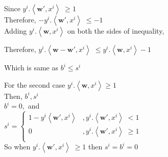 \documentclass[a4paper,11pt]{article}
\begin{document}
\begin{mlsolution}
Since \begin{math} y^{i}.\left \langle \textbf{w}{}', x^{i} \right \rangle \; \geq  1 \end{math} \\
Therefore, \begin{math} - y^{i}.\left \langle \textbf{w}{}', x^{i} \right \rangle \; \leq  -1 \end{math}\\

Adding \begin{math} y^{i}.\left \langle \textbf{w}, x^{i} \right \rangle \end{math} on both the sides of inequality,

Therefore, \begin{math} y^{i}.\left \langle \textbf{w} - \textbf{w}{}', x^{i} \right \rangle \; \leq  y^{i}.\left \langle \textbf{w}, x^{i} \right \rangle - 1 \end{math}

Which is same as \begin{math} b^{i} \leq s^{i} \end{math}

For the second case \begin{math}
y^{i}.\left \langle \textbf{w}, x^{i} \right \rangle \geq 1
\end{math}\\

Then, \begin{math}b^{i}, s^{i}\end{math}\\

\begin{math}
b^{i} = 0 ,
\end{math} and\\

\begin{math}
s^{i} = \left\{\begin{matrix}
1 - y^{i}\left \langle \textbf{w}{}', x^{i}\right \rangle & ,y^{i}.\left \langle \textbf{w}{}', x^{i} \right \rangle \; <  1\\ 
0 & ,y^{i}.\left \langle \textbf{w}{}', x^{i}\right \rangle \; \geq  1\\ \end{matrix}\right.
\end{math}\\ 

So when \begin{math}y^{i}.\left \langle \textbf{w}{}', x^{i} \right \rangle \; \geq  1\end{math} then \; \begin{math} s^{i} = b^{i} = 0 \end{math} \\


\end{mlsolution}
\end{document}
